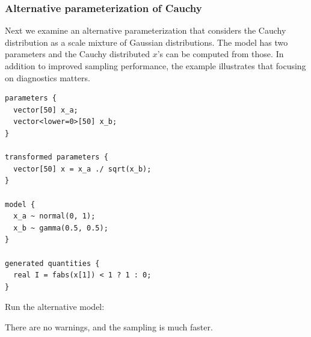 \documentclass[american,]{article}
\begin{document}
\hypertarget{alternative-parameterization-of-cauchy}{%
\subsubsection{Alternative parameterization of
Cauchy}\label{alternative-parameterization-of-cauchy}}

Next we examine an alternative parameterization that considers the
Cauchy distribution as a scale mixture of Gaussian distributions. The
model has two parameters and the Cauchy distributed \(x\)'s can be
computed from those. In addition to improved sampling performance, the
example illustrates that focusing on diagnostics matters.

\begin{verbatim}
parameters {
  vector[50] x_a;
  vector<lower=0>[50] x_b;
}

transformed parameters {
  vector[50] x = x_a ./ sqrt(x_b);
}

model {
  x_a ~ normal(0, 1);
  x_b ~ gamma(0.5, 0.5);
}

generated quantities {
  real I = fabs(x[1]) < 1 ? 1 : 0;
}
\end{verbatim}

Run the alternative model:

There are no warnings, and the sampling is much faster.
\end{document}
